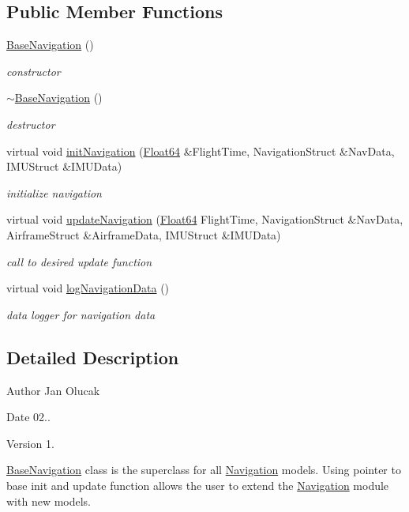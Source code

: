 \subsection*{Public Member Functions}
\begin{DoxyCompactItemize}
\item 
\hyperlink{class_base_navigation_a157886375050e9d16d389a56ef215c47}{Base\+Navigation} ()
\begin{DoxyCompactList}\small\item\em constructor \end{DoxyCompactList}\item 
\hyperlink{class_base_navigation_a8ab9ee34a57aefc6928d083884870c27}{$\sim$\+Base\+Navigation} ()
\begin{DoxyCompactList}\small\item\em destructor \end{DoxyCompactList}\item 
virtual void \hyperlink{class_base_navigation_ad447e31e0ee65180872344f2b2a294a8}{init\+Navigation} (\hyperlink{group___tools_ga3f1431cb9f76da10f59246d1d743dc2c}{Float64} \&Flight\+Time, Navigation\+Struct \&Nav\+Data, I\+M\+U\+Struct \&I\+M\+U\+Data)
\begin{DoxyCompactList}\small\item\em initialize navigation \end{DoxyCompactList}\item 
virtual void \hyperlink{class_base_navigation_ad03c7e67d6b082b6558fd9374468538f}{update\+Navigation} (\hyperlink{group___tools_ga3f1431cb9f76da10f59246d1d743dc2c}{Float64} Flight\+Time, Navigation\+Struct \&Nav\+Data, Airframe\+Struct \&Airframe\+Data, I\+M\+U\+Struct \&I\+M\+U\+Data)
\begin{DoxyCompactList}\small\item\em call to desired update function \end{DoxyCompactList}\item 
virtual void \hyperlink{class_base_navigation_ae6974b3c2fb26c03bbf0f2f26b1e9537}{log\+Navigation\+Data} ()
\begin{DoxyCompactList}\small\item\em data logger for navigation data \end{DoxyCompactList}\end{DoxyCompactItemize}


\subsection{Detailed Description}
\begin{DoxyAuthor}{Author}
Jan Olucak 
\end{DoxyAuthor}
\begin{DoxyDate}{Date}
02.. 
\end{DoxyDate}
\begin{DoxyVersion}{Version}
1.
\end{DoxyVersion}
\hyperlink{class_base_navigation}{Base\+Navigation} class is the superclass for all \hyperlink{class_navigation}{Navigation} models. Using pointer to base init and update function allows the user to extend the \hyperlink{class_navigation}{Navigation} module with new models. 

